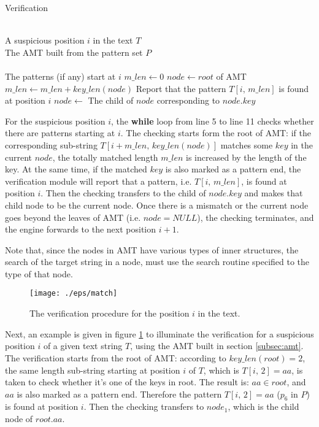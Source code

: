 \begin{algorithm}
  \caption{Verification}\scriptsize
  \label{alg:matching}
  \begin{algorithmic}[1]
    \REQUIRE ~~\\
    A suspicious position $i$ in the text $T$\\
    The AMT built from the pattern set $P$\\
    \ENSURE ~~\\
    The patterns (if any) start at $i$
    \STATE
    \STATE $m\_len \leftarrow 0$
    \STATE $node \leftarrow root$ of AMT
    \STATE
    \STATE $m\_len \leftarrow m\_len + key\_len(node)$
    \STATE Report that the pattern $T[i,\,m\_len]$ is found at position $i$
    \ENDIF
    \STATE $node \leftarrow$ The child of $node$ corresponding to $node.key$
    \ENDWHILE
  \end{algorithmic}
\end{algorithm}

For the suspicious position $i$, the \textbf{while} loop from line 5
to line 11 checks whether there are patterns starting at $i$. The
checking starts form the root of AMT: if the corresponding sub-string
$T[i+m\_len, \, key\_len(node)]$ matches some $key$ in the current
$node$, the totally matched length $m\_len$ is increased by the length
of the key. At the same time, if the matched $key$ is also marked as a
pattern end, the verification module will report that a pattern,
i.e. $T[i,\,m\_len]$, is found at position $i$. Then the checking
transfers to the child of $node.key$ and makes that child node to be
the current node. Once there is a mismatch or the current node goes
beyond the leaves of AMT (i.e.  $node = NULL$), the checking
terminates, and the engine forwards to the next position $i+1$.

Note that, since the nodes in AMT have various types of inner
structures, the search of the target string in a node, must use the
search routine specified to the type of that node.

\begin{figure}[htbp]
  \centering
  \texttt{[image: ./eps/match]}
  \caption{The verification procedure for the position $i$ in the
    text.}
  \label{fig:matching}
\end{figure}

Next, an example is given in figure \ref{fig:matching} to illuminate
the verification for a suspicious position $i$ of a given text string
$T$, using the AMT built in section \ref{subsec:amt}. The verification
starts from the root of AMT: according to $key\_len(root)=2$, the same
length sub-string starting at position $i$ of $T$, which is
$T[i,\,2]=aa$, is taken to check whether it's one of the keys in
root. The result is: $aa \in root$, and $aa$ is also marked as a
pattern end. Therefore the pattern $T[i,\,2]=aa$ ($p_6$ in $P$) is
found at position $i$. Then the checking transfers to $node_1$, which
is the child node of $root.aa$.

